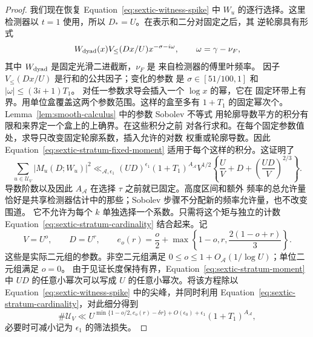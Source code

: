 \documentclass[11pt,a4paper]{article}
\numberwithin{equation}{section}
\numberwithin{figure}{section}
\theoremstyle{definition}
\theoremstyle{remark}
\begin{document}
\begin{proof}
我们现在恢复
Equation~\eqref{eq:sextic-witness-spike} 中 $W_u$ 的逐行选择。这里检测器以
$t=1$ 使用，所以 $D_*=U$。在表示和二分对固定之后，其
逆轮廓具有形式
\[
 W_{\rm dyad}(x)V_{\le}(Dx/U)x^{-\sigma-i\omega},
 \qquad \omega=\gamma-\nu_F,
\]
其中 $W_{\rm dyad}$ 是固定光滑二进截断，$\nu_F$ 是
来自检测器的傅里叶频率。
因子 $V_{\le}(Dx/U)$ 是行和的公共因子；变化的参数
是 $\sigma\in[51/100,1]$ 和 $|\omega|\le(3i+1)T_1$。
对任一参数求导会插入一个 $\log x$ 的幂，它在
固定环带上有界。用单位盒覆盖这两个参数范围。这样的盒至多有
$1+T_1$ 的固定幂次个。Lemma~\ref{lem:smooth-calculus} 中的参数 Sobolev 不等式
用轮廓导数平方的积分有限和来界定一个盒上的上确界。在这些积分之前
对各行求和。在每个固定参数值处，求导只改变固定轮廓系数，插入允许的对数
权重或轮廓导数。因此 Equation~\eqref{eq:sextic-stratum-fixed-moment}
适用于每个这样的积分。这证明了
\begin{equation}\label{eq:sextic-stratum-moment}
 \sum_{u\in\mathcal U_V}|M_u(D;W_u)|^2
 \ll_{\mathcal A,\epsilon_1}(UD)^{\epsilon_1}(1+T_1)^{A_{\mathcal A}}
 V^{1/2}\left\{\frac UV+D+
       \left(\frac{UD}{V}\right)^{2/3}\right\}.
\end{equation}
导数阶数以及因此 $A_{\mathcal A}$ 在选择
$\tau$ 之前就已固定。高度区间和额外
频率的总允许量恰好是共享检测器估计中的那些；Sobolev 步骤不分配新的频率允许量，也不改变围道。
它不允许为每个 $k$ 单独选择一个系数。只需将这个矩与独立的计数
Equation~\eqref{eq:sextic-stratum-cardinality} 结合起来。记
\[
 V=U^o,\qquad D=U^r,\qquad
 e_o(r)=\frac o2+\max\left\{1-o,r,\frac{2(1-o+r)}3\right\}.
\]
这些是实际二元组的参数。非空二元组满足
$0\le o\le1+O_{\mathcal A}(1/\log U)$；单位二元组满足 $o=0$。
由于见证长度保持有界，Equation~\eqref{eq:sextic-stratum-moment} 中
$UD$ 的任意小幂次可以写成 $U$ 的任意小幂次。将该方程除以
Equation~\eqref{eq:sextic-witness-spike} 中的尖峰，并同时利用
Equation~\eqref{eq:sextic-stratum-cardinality}，对此细分得到
\begin{equation}\label{eq:sextic-stratum-envelope}
 \#\mathcal U_V
 \ll U^{\min\{1-o/2,e_o(r)-\delta r\}+O(\epsilon_0)+\epsilon_1}
       (1+T_1)^{A_{\mathcal A}},
\end{equation}
必要时可减小记为 $\epsilon_1$ 的筛法损失。


\end{proof}
\end{document}
